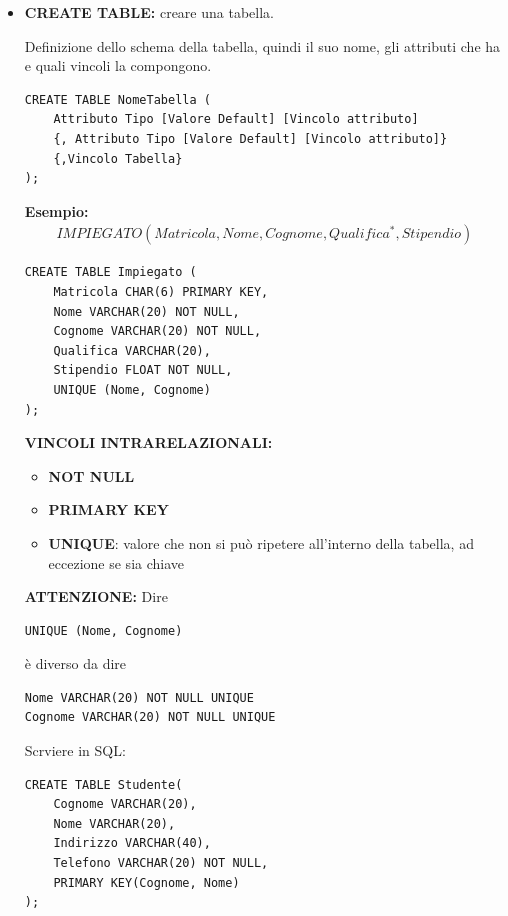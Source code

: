 \documentclass{article}
\begin{document}
\begin{itemize}
    \item \textbf{CREATE TABLE:} creare una tabella.

    Definizione dello schema della tabella, quindi il suo nome, gli attributi che ha e quali vincoli la compongono.

\begin{lstlisting}[style=sqlstyle]
CREATE TABLE NomeTabella (
    Attributo Tipo [Valore Default] [Vincolo attributo]
    {, Attributo Tipo [Valore Default] [Vincolo attributo]}
    {,Vincolo Tabella}
);
\end{lstlisting}

\textbf{Esempio:}
\begin{align*}
    IMPIEGATO(Matricola, Nome, Cognome, Qualifica^*, Stipendio)
\end{align*}

\begin{lstlisting}[style=sqlstyle]
CREATE TABLE Impiegato (
    Matricola CHAR(6) PRIMARY KEY,
    Nome VARCHAR(20) NOT NULL,
    Cognome VARCHAR(20) NOT NULL,
    Qualifica VARCHAR(20),
    Stipendio FLOAT NOT NULL,
    UNIQUE (Nome, Cognome)
);
\end{lstlisting}

\textbf{VINCOLI INTRARELAZIONALI:}
\begin{itemize}
    \item \textbf{NOT NULL}
    \item \textbf{PRIMARY KEY}
    \item \textbf{UNIQUE}: valore che non si può ripetere all'interno della tabella, ad eccezione se sia chiave
\end{itemize}

\textbf{ATTENZIONE:}
	Dire 
	
	\begin{lstlisting}[style=sqlstyle]
	UNIQUE (Nome, Cognome)
	\end{lstlisting}
	
	è diverso da dire
	
\begin{lstlisting}[style=sqlstyle]
Nome VARCHAR(20) NOT NULL UNIQUE
Cognome VARCHAR(20) NOT NULL UNIQUE
\end{lstlisting}

Scrviere in SQL:

\begin{lstlisting}[style=sqlstyle]
CREATE TABLE Studente(
    Cognome VARCHAR(20),
    Nome VARCHAR(20),
    Indirizzo VARCHAR(40),
    Telefono VARCHAR(20) NOT NULL,
    PRIMARY KEY(Cognome, Nome)
);
\end{lstlisting}


\end{itemize}
\end{document}
